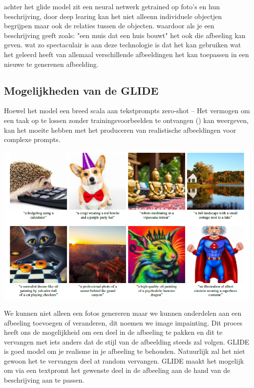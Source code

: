 \documentclass[12pt]{article}
\begin{document}
achter het glide model zit een neural netwerk getrained op foto's en hun beschrijving, door deep learing
kan het niet alleenn individuele objectjen begrijpen maar ook de relaties tussen de objecten.
waardoor als je een beschrijving geeft zoals: "een muis dat een huis bouwt" het ook die afbeeling kan geven.
wat zo spectaculair is aan deze technologie is dat het kan gebruiken wat het geleerd heeft van allemaal verschillende afbeeldingen 
het kan toepassen in een nieuwe te generenen afbeelding.

\subsection{Mogelijkheden van de GLIDE}
Hoewel het model een breed scala aan tekstprompts zero-shot -- Het vermogen om een taak op te lossen zonder
trainingsvoorbeelden te ontvangen (\textcite{RomeraParedes2015}) kan weergeven, kan het moeite hebben met het produceren van realistische
afbeeldingen voor complexe prompts.

\begin{center}
    \includegraphics[width=1\columnwidth]{GLIDE.png}
\end{center}

\bigskip
We kunnen niet alleen een fotos genereren maar we kunnen onderdelen aan een afbeeling toevoegen of veranderen,
dit noemen we image impainting. Dit proces heeft ons de mogelijkheid om een deel in de afbeeling te pakken
en dit te vervangen met iets anders dat de stijl van de afbeelding steeds zal volgen. GLIDE is goed model om je realisme in je
afbeeling te behouden. Natuurlijk zal het niet gewoon het te vervangen deel at random vervangen. GLIDE maakt het
mogelijk om via een textpromt het gewenste deel in de afbeeling aan de hand van de beschrijving aan te passen. 
\end{document}

